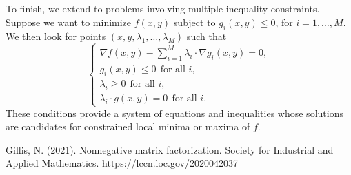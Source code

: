 \documentclass{amsart}
\begin{document}
To finish, we extend to problems involving multiple inequality constraints. Suppose we want to minimize $f(x,y)$ subject to $g_i(x,y)\leq 0$, for $i=1,\ldots, M$. We then look for points $(x,y,\lambda_1,\ldots,\lambda_M)$ such that
\begin{equation}
    \label{KKT_conditions}
    \begin{cases}
    \nabla f(x,y) -\sum_{i=1}^M \lambda_i\cdot \nabla g_i(x,y)= 0,\\
    g_i(x,y)\leq 0\ \ \text{for all $i$},\\
    \lambda_i\geq 0\ \ \text{for all $i$},\\
    \lambda_i\cdot g(x,y)= 0\ \ \text{for all $i$.}
    \end{cases}
\end{equation}
These conditions provide a system of equations and inequalities whose solutions are candidates for constrained local minima or maxima of $f$.


\begin{thebibliography}{9}
    Gillis, N. (2021). Nonnegative matrix factorization. Society for Industrial and Applied Mathematics. https://lccn.loc.gov/2020042037
\end{thebibliography}
\end{document}
